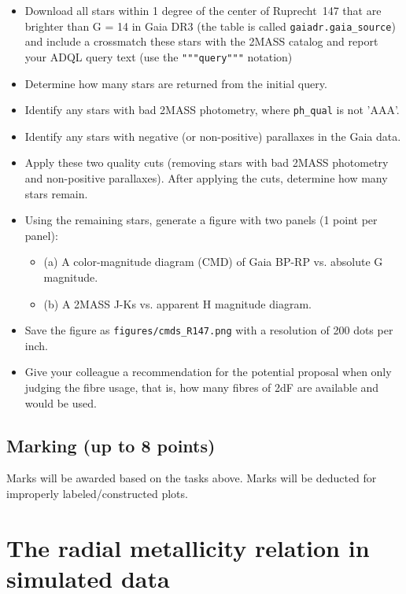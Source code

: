 \documentclass[a4paper,12pt]{article}
\begin{document}
\begin{itemize}
    \item Download all stars within 1 degree of the center of Ruprecht~147  that are brighter than G = 14 in Gaia DR3 (the table is called \texttt{gaiadr.gaia\_source}) and include a crossmatch these stars with the 2MASS catalog and report your ADQL query text (use the \texttt{"""query"""} notation)
    \item Determine how many stars are returned from the initial query.
    \item Identify any stars with bad 2MASS photometry, where \texttt{ph\_qual} is not 'AAA'.
    \item Identify any stars with negative (or non-positive) parallaxes in the Gaia data.
    \item Apply these two quality cuts (removing stars with bad 2MASS photometry and non-positive parallaxes). After applying the cuts, determine how many stars remain.
    \item Using the remaining stars, generate a figure with two panels (1 point per panel):
    \begin{itemize}
        \item (a) A color-magnitude diagram (CMD) of Gaia BP-RP vs. absolute G magnitude.
        \item (b) A 2MASS J-Ks vs. apparent H magnitude diagram.
    \end{itemize}
    \item Save the figure as \texttt{figures/cmds\_R147.png} with a resolution of 200 dots per inch.
    \item Give your colleague a recommendation for the potential proposal when only judging the fibre usage, that is, how many fibres of 2dF are available and would be used.
\end{itemize}

\subsection{Marking (up to 8 points)}

Marks will be awarded based on the tasks above. Marks will be deducted for improperly labeled/constructed plots.

\newpage

\section{The radial metallicity relation in simulated data}
\end{document}
